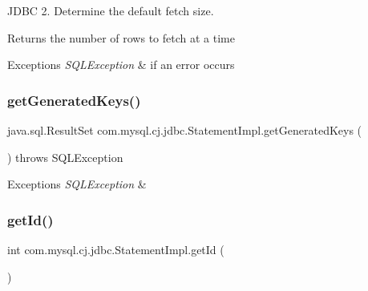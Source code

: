 J\+D\+BC 2. Determine the default fetch size.

\begin{DoxyReturn}{Returns}
the number of rows to fetch at a time
\end{DoxyReturn}

\begin{DoxyExceptions}{Exceptions}
{\em S\+Q\+L\+Exception} & if an error occurs \\
\hline
\end{DoxyExceptions}
\mbox{\label{classcom_1_1mysql_1_1cj_1_1jdbc_1_1_statement_impl_a498dcb08802ab5ebfb700b3bae3ff1f2}} 
\subsubsection{\texorpdfstring{get\+Generated\+Keys()}{getGeneratedKeys()}}
{\footnotesize\ttfamily java.\+sql.\+Result\+Set com.\+mysql.\+cj.\+jdbc.\+Statement\+Impl.\+get\+Generated\+Keys (\begin{DoxyParamCaption}{ }\end{DoxyParamCaption}) throws S\+Q\+L\+Exception}


\begin{DoxyExceptions}{Exceptions}
{\em S\+Q\+L\+Exception} & \\
\hline
\end{DoxyExceptions}
\mbox{\label{classcom_1_1mysql_1_1cj_1_1jdbc_1_1_statement_impl_a42a752f62a59215845a9faf514893dba}} 
\subsubsection{\texorpdfstring{get\+Id()}{getId()}}
{\footnotesize\ttfamily int com.\+mysql.\+cj.\+jdbc.\+Statement\+Impl.\+get\+Id (\begin{DoxyParamCaption}{ }\end{DoxyParamCaption})}

